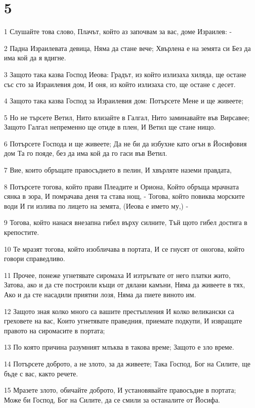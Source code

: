 \chapter{5}

\par 1 Слушайте това слово, Плачът, който аз започвам за вас, доме Израилев: -
\par 2 Падна Израилевата девица, Няма да стане вече; Хвърлена е на земята си Без да има кой да я вдигне.
\par 3 Защото така казва Господ Иеова: Градът, из който излизаха хиляда, ще остане със сто за Израилевия дом, И оня, из който излизаха сто, ще остане с десет.
\par 4 Защото така казва Господ за Израилевия дом: Потърсете Мене и ще живеете;
\par 5 Но не търсете Ветил, Нито влизайте в Галгал, Нито заминавайте във Вирсавее; Защото Галгал непременно ще отиде в плен, И Ветил ще стане нищо.
\par 6 Потърсете Господа и ще живеете; Да не би да избухне като огън в Йосифовия дом Та го пояде, без да има кой да го гаси във Ветил.
\par 7 Вие, които обръщате правосъдието в пелин, И хвърляте наземи правдата,
\par 8 Потърсете тогова, който прави Плеадите и Ориона, Който обръща мрачната сянка в зора, И помрачава деня та става нощ, - Тогова, който повиква морските води И ги излива по лицето на земята, (Иеова е името му,) -
\par 9 Тогова, който нанася внезапна гибел върху силните, Тъй щото гибел достига в крепостите.
\par 10 Те мразят тогова, който изобличава в портата, И се гнусят от оногова, който говори справедливо.
\par 11 Прочее, понеже угнетявате сиромаха И изтръгвате от него платки жито, Затова, ако и да сте построили къщи от дялани камъни, Няма да живеете в тях, Ако и да сте насадили приятни лозя, Няма да пиете виното им.
\par 12 Защото зная колко много са вашите престъпления И колко великански са греховете на вас, Които угнетявате праведния, приемате подкупи, И извращате правото на сиромасите в портата;
\par 13 По която причина разумният млъква в такова време; Защото е зло време.
\par 14 Потърсете доброто, а не злото, за да живеете; Така Господ, Бог на Силите, ще бъде с вас, както речете.
\par 15 Мразете злото, обичайте доброто, И установявайте правосъдие в портата; Може би Господ, Бог на Силите, да се смили за останалите от Йосифа.
